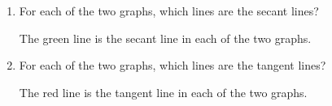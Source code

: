 \documentclass[nooutcomes]{ximera}
\begin{document}
\begin{problem}
\begin{enumerate}
    \item 
      For each of the two graphs, which lines are the secant lines?
      \begin{freeResponse}
        The green line is the secant line in each of the two graphs.        
      \end{freeResponse}

    \item 
      For each of the two graphs, which lines are the tangent lines?
      \begin{freeResponse}
        The red line is the tangent line in each of the two graphs.        
      \end{freeResponse}

  \end{enumerate}
\end{problem}

		
		
\end{document}
